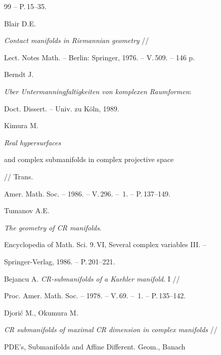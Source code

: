 \begin{thebibliography}{99}
-- P.\,15--35.







Blair D.E.


{\em Contact manifolds in Riemannian geometry} //


Lect. Notes Math. -- Berlin: Springer, 1976. -- V.\,509. -- 146 p.







Berndt J.


{\em Uber Untermanningfaltigkeiten von komplexen Raumformen}:


Doct. Dissert. -- Univ. zu K\"oln, 1989.







Kimura M.


{\em   Real hypersurfaces


and complex submanifolds in complex projective space} // Trans.


Amer. Math. Soc. -- 1986. -- V.\,296. -- \No\,1. -- P.\,137--149.







Tumanov A.E.


{\em  The geometry of CR manifolds}.


Encyclopedia of Math. Sci.  9.\,VI, Several complex variables III. --


Springer-Verlag, 1986. -- P.\,201--221.










Bejancu A. {\em CR-submanifolds of a Kaehler manifold.} I //


Proc. Amer. Math. Soc. -- 1978. -- V.\,69. -- \No\,1. -- P.\,135--142.







Djori\'c M., Okumura M.


{\em CR submanifolds of maximal CR dimension in complex manifolds} //


PDE's, Submanifolds and Affine Different. Geom., Banach



\end{thebibliography}

